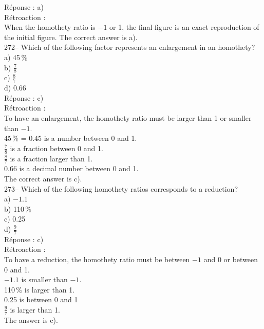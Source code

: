 \documentclass[letterpaper, 12pt]{article}
\begin{document}
R\'eponse : a)\\

R\'etroaction : \\
When the homothety ratio is $-1$ or 1, the final figure is an exact
reproduction of the initial figure. The correct answer is a).\\


272-- Which of the following factor represents an enlargement in an
homothety?\\

a) 45$\,\%$\\[2mm]
b) $\frac{7}{8}$\\[2mm]
c) $\frac{8}{7}$\\[2mm]
d) 0.66\\

R\'eponse : c)\\

R\'etroaction :\\
To have an enlargement, the homothety ratio must be larger than 1 or
smaller than $-1$.\\[2mm]
45$\,\%$ = 0.45 is a number between 0 and 1.\\[2mm]
$\frac{7}{8}$ is a fraction between 0 and 1.\\[2mm]
$\frac{8}{7}$ is a fraction larger than 1.\\[2mm]
0.66 is a decimal number between 0 and 1.\\[2mm]
The correct answer is c).\\

273-- Which of the following homothety ratios corresponds to a
reduction?\\

a) $-1.1$\\[2mm]
b) 110$\,\%$\\[2mm]
c) 0.25\\[2mm]
d) $\frac{9}{7}$\\

R\'eponse : c)\\

R\'etroaction : \\
To have a reduction, the homothety ratio must be between $-1$
and 0 or between 0 and 1.\\[2mm]
$-1.1$ is smaller than $-1$.\\[2mm]
110$\,\%$ is larger than 1.\\[2mm]
0.25 is between 0 and 1\\[2mm]
$\frac{9}{7}$ is larger than 1.\\[2mm]
The answer is c).\\
\end{document}
